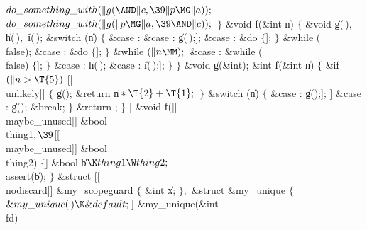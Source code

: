 ${}\\{do\_something\_with}(\|g({\AND}\|c,\39\|p\MG\|a));{}$\6
${}\\{do\_something\_with}(\|g(\|p\MG\|a,\39{\AND}\|c));{}$\6
\4${}\}{}$\2\7
\1\1\&{void} \|f(\&{int} \|n)\2\2\6
${}\{{}$\1\6
\&{void} \|g(\,)${},{}$ \|h(\,)${},{}$ \|i(\,);\7
\&{switch} (\|n)\5
${}\{{}$\1\6
\4\&{case} :\5
\&{case} :\5
\|g(\,);\6
[[\\{fallthrough}]];\6
\4\&{case} :\5
\&{do}\5
${}\{{}$\1\6
[[\\{fallthrough}]];\6
\4${}\}{}$\2\5
\&{while} (\\{false});\6
\4\&{case} :\5
\&{do}\5
${}\{{}$\1\6
[[\\{fallthrough}]];\6
\4${}\}{}$\2\5
\&{while} ${}(\|n\MM);{}$\6
\4\&{case} :\6
\&{while} (\\{false})\5
${}\{{}$\1\6
[[\\{fallthrough}]];\6
\4${}\}{}$\2\6
\4\&{case} :\5
\|h(\,);\6
\4\&{case} :\5
\|i(\,);\6
[[\\{fallthrough}]];\6
\4${}\}{}$\2\6
\4${}\}{}$\2\7
\&{void} \|g(\&{int});\7
\1\1\&{int} \|f(\&{int} \|n)\2\2\6
${}\{{}$\1\6
\&{if} ${}(\|n>\T{5}){}$ [[\\{unlikely}]]\5
${}\{{}$\1\6
\|g();\6
\&{return} \|n${}*\T{2}+\T{1};{}$\6
\4${}\}{}$\2\6
\&{switch} (\|n)\5
${}\{{}$\1\6
\4\&{case} :\5
\|g();\6
[[\\{fallthrough}]];\6
\4[[\\{likely}]] \&{case} :\5
\|g();\6
\&{break};\6
\4${}\}{}$\2\6
\&{return} ;\6
\4${}\}{}$\2\7
\1\1[[\\{maybe\_unused}]] \&{void} \|f([[\\{maybe\_unused}]] \&{bool} %
\\{thing1}${},\39{}$[[\\{maybe\_unused}]] \&{bool} \\{thing2})\2\2\6
${}\{{}$\1\6
[[\\{maybe\_unused}]] \&{bool} \|b${}\K\\{thing1}\W\\{thing2};{}$\7
\\{assert}(\|b);\6
\4${}\}{}$\2\7
\&{struct} [[\\{nodiscard}]] \&{my\_scopeguard} ${}\{{}$\1\6
\&{int} \|x;\2\6
${}\};{}$\6
\&{struct} \&{my\_unique} ${}\{{}$\1\6
${}\&{my\_unique}(\,)\K\&{default};{}$\7
[[\\{nodiscard}]] \&{my\_unique}(\&{int} \\{fd})\1\1\2\2\6
